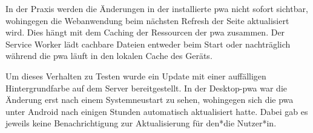 In der Praxis werden die Änderungen in der installierte \ac{pwa} nicht sofort sichtbar, wohingegen die Webanwendung beim nächsten Refresh der Seite aktualisiert wird. Dies hängt mit dem Caching der Ressourcen der \ac{pwa} zusammen. Der Service Worker lädt cachbare Dateien entweder beim Start oder nachträglich während die \ac{pwa} läuft in den lokalen Cache des Geräts.

Um dieses Verhalten zu Testen wurde ein Update mit einer auffälligen Hintergrundfarbe auf dem Server bereitgestellt. In der Desktop-\ac{pwa} war die Änderung erst nach einem Systemneustart zu sehen, wohingegen sich die \ac{pwa} unter Android nach einigen Stunden automatisch aktualisiert hatte. Dabei gab es jeweils keine Benachrichtigung zur Aktualisierung für den*die Nutzer*in.






